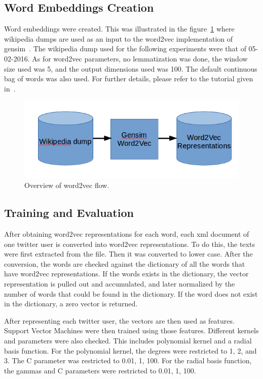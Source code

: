 \documentclass{llncs}
\begin{document}
\subsection{Word Embeddings Creation}
Word embeddings were created. This was illustrated in the figure~\ref{W2vFlow} where wikipedia dumps are used as an input to the word2vec implementation of gensim~\cite{rehurek_lrec}. The wikipedia dump used for the following experiments were that of 05-02-2016. As for word2vec parameters, no lemmatization was done, the window size used was 5, and the output dimensions used was 100. The default continuous bag of words was also used. For further details, please refer to the tutorial given in~\cite{TrainWord2Vec}.

\begin{figure}
\centering
\caption{Overview of word2vec flow.}
\label{W2vFlow}
\includegraphics[scale=.5]{Word2Vec.png}
\end{figure}
\subsection{Training and Evaluation}
After obtaining word2vec representations for each word, each xml document of one twitter user is converted into word2vec representations. To do this, the texts were first extracted from the file. Then it was converted to lower case. After the conversion, the words are checked against the dictionary of all the words that have word2vec representations. If the words exists in the dictionary, the vector representation is pulled out and accumulated, and later normalized by the number of words that could be found in the dictionary. If the word does not exist in the dictionary, a zero vector is returned. 

After representing each twitter user, the vectors are then used as features. Support Vector Machines were then trained using those features. Different kernels and parameters were also checked. This includes polynomial kernel and a radial basis function. For the polynomial kernel, the degrees were restricted to 1, 2, and 3. The C parameter was restricted to 0.01, 1, 100. For the radial basis function, the gammas and C parameters were restricted to 0.01, 1, 100.
\end{document}
